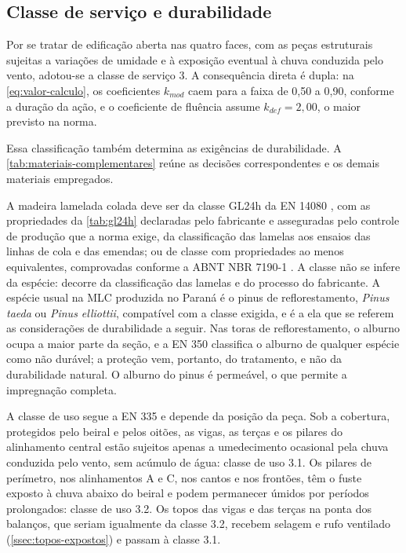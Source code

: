 \subsection{Classe de serviço e durabilidade}\label{ssec:classe-servico}

Por se tratar de edificação aberta nas quatro faces, com as peças estruturais
sujeitas a variações de umidade e à exposição eventual à chuva conduzida
pelo vento, adotou-se a classe de serviço 3. A consequência direta é dupla:
na \autoref{eq:valor-calculo}, os coeficientes $k_{mod}$ caem para a faixa de
0,50 a 0,90, conforme a duração da ação, e o coeficiente de fluência assume
$k_{def} = 2{,}00$, o maior previsto na norma.

Essa classificação também determina as exigências de durabilidade. A
\autoref{tab:materiais-complementares} reúne as decisões correspondentes e os
demais materiais empregados.

A madeira lamelada colada deve ser da classe GL24h da EN 14080
\cite{EN14080:2013}, com as propriedades da \autoref{tab:gl24h} declaradas pelo
fabricante e asseguradas pelo controle de produção que a norma exige, da
classificação das lamelas aos ensaios das linhas de cola e das emendas; ou de
classe com propriedades ao menos equivalentes, comprovadas conforme a ABNT
NBR 7190-1 \cite{NBR7190-1:2022}. A classe não se infere da espécie: decorre da
classificação das lamelas e do processo do fabricante. A espécie usual na MLC
produzida no Paraná é o pinus de reflorestamento, \textit{Pinus taeda} ou
\textit{Pinus elliottii}, compatível com a classe exigida, e é a ela que se
referem as considerações de durabilidade a seguir. Nas toras de reflorestamento, o alburno ocupa a maior parte da seção,
e a EN 350 \cite{EN350:2016} classifica o alburno de qualquer espécie como não
durável; a proteção vem, portanto, do tratamento, e não da durabilidade natural.
O alburno do pinus é permeável, o que permite a impregnação completa.

A classe de uso segue a EN 335 \cite{EN335:2013} e depende da posição da peça.
Sob a cobertura, protegidos pelo beiral e pelos oitões, as vigas, as terças e
os pilares do alinhamento central estão sujeitos apenas a umedecimento
ocasional pela chuva conduzida pelo vento, sem acúmulo de água: classe de uso
3.1. Os pilares de perímetro, nos alinhamentos A e C, nos cantos e nos frontões,
têm o fuste exposto à chuva abaixo do beiral e podem permanecer úmidos por
períodos prolongados: classe de uso 3.2. Os topos das vigas e das terças na
ponta dos balanços, que seriam igualmente da classe 3.2, recebem selagem e rufo
ventilado (\autoref{ssec:topos-expostos}) e passam à classe 3.1.

